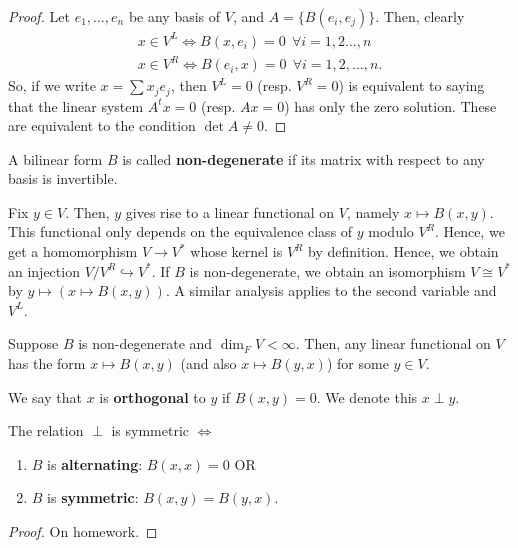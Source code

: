 \begin{proof}
    Let $e_1,\dots,e_n$ be any basis of $V$, and $A=\{B(e_i,e_j)\}$. Then, clearly
    \begin{align*}
        x \in V^L \iff B(x,e_i) =0 \:\:\forall i=1,2\dots,n \\ x \in V^R \iff B(e_i,x)=0 \: \: \forall i = 1,2,\dots,n.
    \end{align*}
    So, if we write $x = \sum x_je_j$, then $V^L=0$ (resp. $V^R=0$) is equivalent to saying that the linear system $A^tx = 0$ (resp. $Ax=0$) has only the zero solution. These are equivalent to the condition $\det A \neq 0$.
\end{proof}

\begin{defn}
    A bilinear form $B$ is called \textbf{non-degenerate} if its matrix with respect to any basis is invertible.
\end{defn}

Fix $y \in V$. Then, $y$ gives rise to a linear functional on $V$, namely $x \mapsto B(x,y)$. This functional only depends on the equivalence class of $y$ modulo $V^R$. Hence, we get a homomorphism $V \to V^*$ whose kernel is $V^R$ by definition. Hence, we obtain an injection $V/V^R \hookrightarrow V^*$. If $B$ is non-degenerate, we obtain an isomorphism $V \cong V^*$ by $y \mapsto (x \mapsto B(x,y))$. A similar analysis applies to the second variable and $V^L$.

\begin{prop}
    Suppose $B$ is non-degenerate and $\dim _FV<\infty$. Then, any linear functional on $V$ has the form $x \mapsto B(x,y)$ (and also $x \mapsto B(y,x)$) for some $y \in V$.
\end{prop}

\begin{defn}
    We say that $x$ is \textbf{orthogonal} to $y$ if $B(x,y)=0$. We denote this $x \perp y$.
\end{defn}

\begin{thm}
    The relation $\perp$ is symmetric $\iff$
    \begin{enumerate}
        \item $B$ is \textbf{alternating}: $B(x,x)=0$ OR
        \item $B$ is \textbf{symmetric}: $B(x,y)=B(y,x)$.
    \end{enumerate}
\end{thm}

\begin{proof}
    On homework.
\end{proof}

